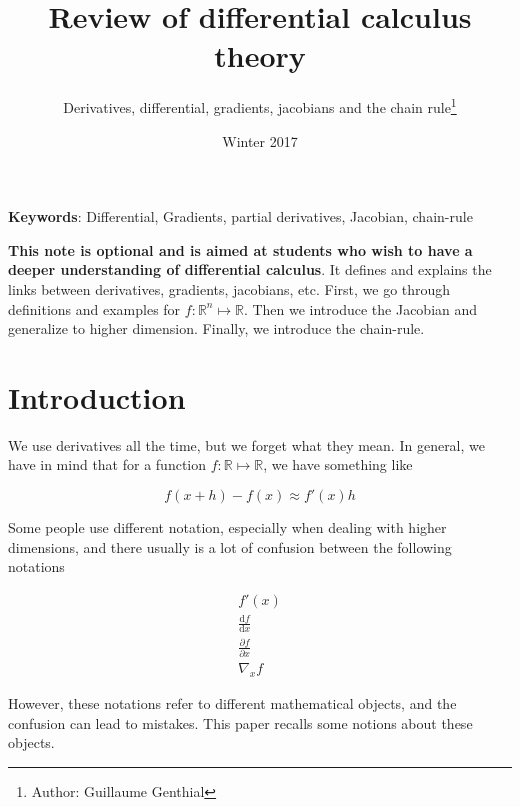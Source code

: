 \documentclass{tufte-handout}
\title{Review of differential calculus theory}
\author[Guillaume Genthial]{Derivatives, differential, gradients, jacobians and the chain rule\thanks{Author: Guillaume Genthial}}
\date{Winter 2017} %
\newcommand{\ud}{\mathrm{d}}
\begin{document}
\maketitle

\textbf{Keywords}:
\noindent Differential, Gradients, partial derivatives, Jacobian, chain-rule

\bigskip

\textbf{This note is optional and is aimed at students who wish to have a deeper understanding of differential calculus}. It defines and explains the links between derivatives, gradients, jacobians, etc. First, we go through definitions and examples for $ f : \mathbb{R}^n \mapsto \mathbb{R} $. Then we introduce the Jacobian and generalize to higher dimension. Finally, we introduce the chain-rule.


\section{Introduction}


We use derivatives all the time, but we forget what they mean. In general, we have in mind that for a function $ f : \mathbb{R} \mapsto \mathbb{R} $, we have something like 

$$ f(x+h) - f(x) \approx f'(x)h $$

Some people use different notation, especially when dealing with higher dimensions, and there usually is a lot of confusion between the following notations

\begin{align*}
f'(x)\\
\frac{\ud f}{\ud x}\\
\frac{\partial f}{\partial x}\\
\nabla_x f
\end{align*}

However, these notations refer to different mathematical objects, and the confusion can lead to mistakes. This paper recalls some notions about these objects.
\end{document}
